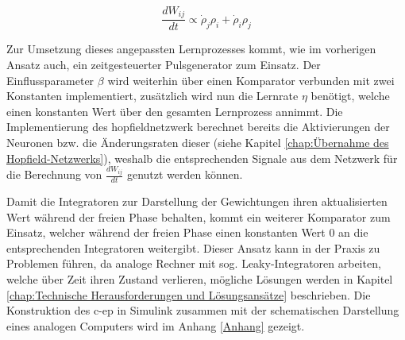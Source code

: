 \[\frac{dW_{ij}}{dt}\propto\dot{\rho}_j\rho_i+\dot{\rho}_i\rho_j\]

Zur Umsetzung dieses angepassten Lernprozesses kommt, wie im vorherigen Ansatz auch, ein zeitgesteuerter Pulsgenerator zum Einsatz. Der Einflussparameter \(\beta\) wird weiterhin über einen Komparator verbunden mit zwei Konstanten implementiert, zusätzlich wird nun die Lernrate \(\eta\) benötigt, welche einen konstanten Wert über den gesamten Lernprozess annimmt. Die Implementierung des \gls{hopfieldnetzwerk} berechnet bereits die Aktivierungen der Neuronen bzw. die Änderungsraten dieser (siehe Kapitel \ref{chap:Übernahme des Hopfield-Netzwerks}), weshalb die entsprechenden Signale aus dem Netzwerk für die Berechnung von \(\frac{dW_{ij}}{dt}\) genutzt werden können.

Damit die Integratoren zur Darstellung der Gewichtungen ihren aktualisierten Wert während der freien Phase behalten, kommt ein weiterer Komparator zum Einsatz, welcher während der freien Phase einen konstanten Wert \(0\) an die entsprechenden Integratoren weitergibt. Dieser Ansatz kann in der Praxis zu Problemen führen, da analoge Rechner mit sog. Leaky-Integratoren arbeiten, welche über Zeit ihren Zustand verlieren, mögliche Lösungen werden in Kapitel \ref{chap:Technische Herausforderungen und Lösungsansätze} beschrieben. Die Konstruktion des \gls{c-ep} in Simulink zusammen mit der schematischen Darstellung eines analogen Computers wird im Anhang \ref{Anhang} gezeigt.
